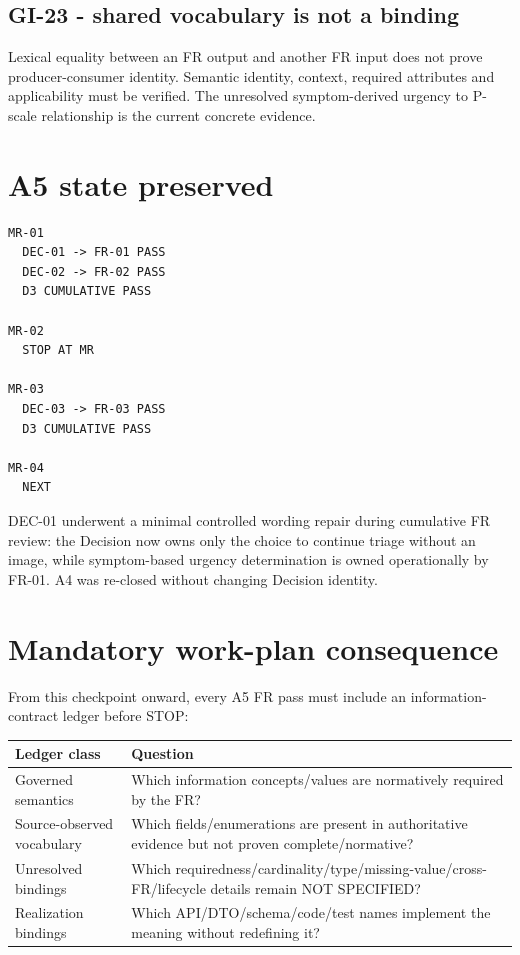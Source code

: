 \documentclass[11pt,a4paper]{article}
\begin{document}
\subsection{GI-23 - shared vocabulary is not a binding}
Lexical equality between an FR output and another FR input does not prove producer-consumer identity. Semantic identity, context, required attributes and applicability must be verified. The unresolved symptom-derived urgency to P-scale relationship is the current concrete evidence.

\section{A5 state preserved}
\begin{lstlisting}
MR-01
  DEC-01 -> FR-01 PASS
  DEC-02 -> FR-02 PASS
  D3 CUMULATIVE PASS

MR-02
  STOP AT MR

MR-03
  DEC-03 -> FR-03 PASS
  D3 CUMULATIVE PASS

MR-04
  NEXT
\end{lstlisting}

DEC-01 underwent a minimal controlled wording repair during cumulative FR review: the Decision now owns only the choice to continue triage without an image, while symptom-based urgency determination is owned operationally by FR-01. A4 was re-closed without changing Decision identity.

\section{Mandatory work-plan consequence}
From this checkpoint onward, every A5 FR pass must include an information-contract ledger before STOP:

\begin{longtable}{L{45mm}L{105mm}}\toprule
\textbf{Ledger class} & \textbf{Question} \\
\midrule\endhead
Governed semantics & Which information concepts/values are normatively required by the FR? \\
Source-observed vocabulary & Which fields/enumerations are present in authoritative evidence but not proven complete/normative? \\
Unresolved bindings & Which requiredness/cardinality/type/missing-value/cross-FR/lifecycle details remain NOT SPECIFIED? \\
Realization bindings & Which API/DTO/schema/code/test names implement the meaning without redefining it? \\
\bottomrule\end{longtable}
\end{document}
